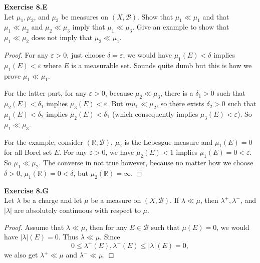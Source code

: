 \documentclass[12pt, a4paper]{article}
\theoremstyle{plain}
\newcommand{\B}{\mathscr{B}}
\newcommand{\R}{\mathbb{R}}
\def\epsilon{\varepsilon}
\newenvironment{exercise}[2][Exercise]
    { \begin{mdframed}[backgroundcolor=gray!20] \textbf{#1 #2} \\}
    {  \end{mdframed}}
\begin{document}
\begin{exercise}{8.E}
    Let $\mu_1,\mu_2$, and $\mu_3$ be measures on $(X,\B)$. Show that $\mu_1\ll \mu_1$ and that $\mu_1\ll \mu_2$ and $\mu_2\ll \mu_3$ imply that $\mu_1\ll\mu_3$. Give an example to show that $\mu_1\ll\mu_2$ does not imply that $\mu_2\ll\mu_1$.
\end{exercise}
    \begin{proof}
        For any $\epsilon>0$, just choose $\delta=\epsilon$, we would have $\mu_1(E)<\delta$ implies $\mu_1(E)<\epsilon$ where $E$ is a measurable set. Sounds quite dumb but this is how we prove $\mu_1\ll\mu_1$.

        For the latter part, for any $\epsilon>0$, because $\mu_2\ll\mu_3$, there is a $\delta_1>0$ such that $\mu_2(E)<\delta_1$ implies $\mu_3(E)<\epsilon$. But $mu_1\ll\mu_2$, so there exists $\delta_2>0$ such that $\mu_1(E)<\delta_2$ implies $\mu_2(E)<\delta_1$ (which consequently implies $\mu_3(E)<\epsilon$). So $\mu_1\ll\mu_3$.

        For the example, consider $(\R,\B)$, $\mu_2$ is the Lebesgue measure and $\mu_1(E)=0$ for all Borel set $E$. For any $\epsilon>0$, we have $\mu_2(E)<1$ implies $\mu_1(E)=0<\epsilon$. So $\mu_1\ll\mu_2$. The converse in not true however, because no matter how we choose $\delta>0$, $\mu_1(\R)=0<\delta$, but $\mu_2(\R)=\infty$.
    \end{proof}


\begin{exercise}{8.G}
    Let $\lambda$ be a charge and let $\mu$ be a measure on $(X,\B)$. If $\lambda\ll\mu$, then $\lambda^+,\lambda^-$, and $|\lambda|$ are absolutely continuous with respect to $\mu$.
\end{exercise}
    \begin{proof}
        Assume that $\lambda\ll\mu$, then for any $E\in\B$ such that $\mu(E)=0$, we would have $|\lambda|(E)=0$. Thus $\lambda\ll\mu$. Since
        \[
        0\leq \lambda^+(E),\lambda^-(E) \leq |\lambda|(E)=0,
        \]
        we also get $\lambda^+\ll\mu$ and $\lambda^-\ll\mu$.
    \end{proof}
\end{document}
